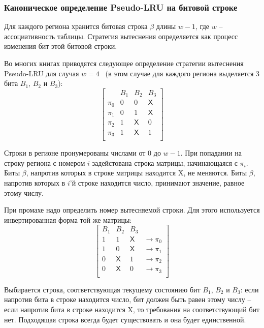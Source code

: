 \documentclass[14pt]{extreport}
\newcommand{\PseudoLRU}{\textsf{Pseudo-LRU}\xspace}
\begin{document}
\subsubsection{Каноническое определение \PseudoLRU на битовой строке}

Для каждого региона хранится битовая строка $\beta$ длины $w-1$, где $w$ --
ассоциативность таблицы. Стратегия вытеснения определяется как процесс изменения бит этой битовой строки.

Во многих книгах приводятся следующее определение стратегии
вытеснения \PseudoLRU для случая
$w=4$~\cite{FundamentalOfComputerOrganizationAndDesign} (в этом
случае для каждого региона выделяется 3 бита $B_1$, $B_2$ и $B_3$):
$$ \left[
  \begin{array}{c|ccc}
          & B_1 & B_2 & B_3 \\ \hline
    \pi_0 & 0 & 0 & \textsf{X} \\
    \pi_1 & 0 & 1 & \textsf{X} \\
    \pi_2 & 1 & \textsf{X} & 0 \\
    \pi_3 & 1 & \textsf{X} & 1 \\
  \end{array}
\right]
$$

Строки в регионе пронумерованы числами от 0 до $w-1$. При попадании на строку региона с номером $i$ задейстована строка матрицы, начинающаяся с $\pi_i$. Биты $\beta$, напротив которых в строке матрицы находится \textsf{X}, не меняются. Биты $\beta$, напротив которых в $i$'й строке находится число, принимают значение, равное этому числу.

При промахе надо определить номер вытесняемой строки. Для этого используется инвертированная форма той же матрицы:
$$
\left[
  \begin{array}{ccc|c}
    B_1 & B_2 & B_3 & \\ \hline
    1 & 1 & \textsf{X} & \rightarrow \pi_0 \\
    1 & 0 & \textsf{X} & \rightarrow \pi_1 \\
    0 & \textsf{X} & 1 & \rightarrow \pi_2 \\
    0 & \textsf{X} & 0 & \rightarrow \pi_3 \\
  \end{array}
\right]
$$

Выбирается строка, соответствующая текущему состоянию бит $B_1$,
$B_2$ и $B_3$: если напротив бита в строке находится число, бит
должен быть равен этому числу -- если напротив бита в строке
находится \textsf{X}, то требования на соответствующий бит нет.
Подходящая строка всегда будет существовать и она будет
единственной.
\end{document}
